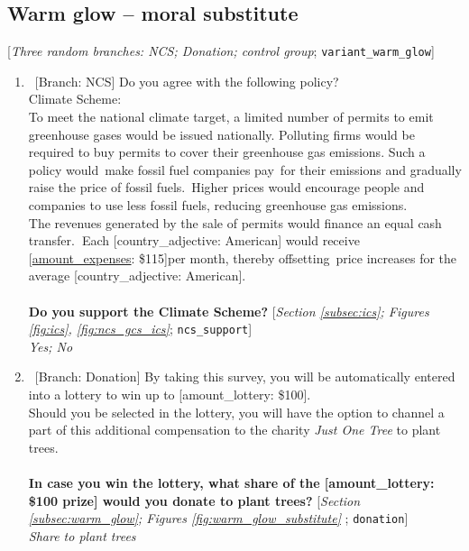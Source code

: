  \subsection*{Warm glow -- moral substitute} 
 [\textit{Three random branches: NCS; Donation; control group};  \verb|variant_warm_glow|] 
 \begin{enumerate}[resume] 
\item ~[Branch: NCS] \label{q:ncs_support} Do you agree with the following policy?
~\\
Climate Scheme:~\\
To meet the national climate target, a limited number of permits to emit greenhouse gases would be issued nationally. Polluting firms would be required to buy permits to cover their greenhouse gas emissions. Such a policy would~make fossil fuel companies pay~for their emissions and gradually raise the price of fossil fuels.~Higher prices would encourage people and companies to use less fossil fuels, reducing greenhouse gas emissions.\\
The revenues generated by the sale of permits would finance an equal cash transfer.\textbf{~}Each [country\_adjective: American] would receive [\hyperlink{tab_features}{amount\_expenses}: \$115]per month, thereby offsetting~price increases for the average [country\_adjective: American].\\ 
~\\
\textbf{Do you support the Climate Scheme?} [\textit{Section \ref{subsec:ics}; Figures \ref{fig:ics}, \ref{fig:ncs_gcs_ics}}; 
\verb|ncs_support|]
  \\ \textit{Yes; No}

\item ~[Branch: Donation] \label{q:donation} By taking this survey, you will be automatically entered into a lottery to win up to [amount\_lottery: \$100]. \\Should you be selected in the lottery, you will have the option to channel a part of this additional compensation to the charity \textit{Just One Tree} to plant trees.\\\\\textbf{In case you win the lottery, what share of the [amount\_lottery: \$100 prize] would you donate to plant trees?} [\textit{Section \ref{subsec:warm_glow}; Figures \ref{fig:warm_glow_substitute}%
}; 
\verb|donation|]
  \\ \textit{Share to plant trees}

\end{enumerate} 

